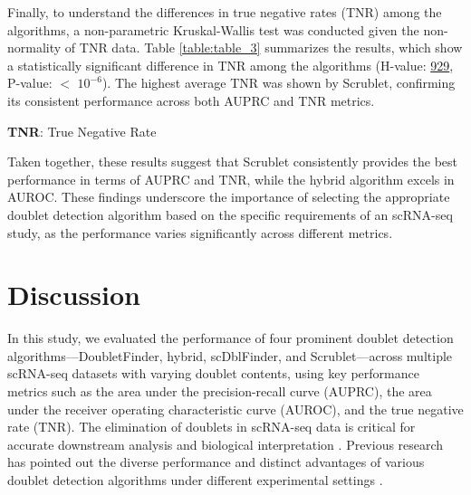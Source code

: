 \documentclass[11pt]{article}
\begin{document}
Finally, to understand the differences in true negative rates (TNR) among the algorithms, a non-parametric Kruskal-Wallis test was conducted given the non-normality of TNR data. Table \ref{table:table_3} summarizes the results, which show a statistically significant difference in TNR among the algorithms (H-value: \hyperlink{D0a}{929}, P-value: $<$ \hyperlink{D0b}{$10^{-6}$}). The highest average TNR was shown by Scrublet, confirming its consistent performance across both AUPRC and TNR metrics.

\begin{table}[h]
\caption{\protect\hyperlink{file-table-3-pkl}{Kruskal-Wallis results comparing True Negative Rate (TNR) across algorithms}}
\label{table:table_3}
\begin{threeparttable}
\renewcommand{\TPTminimum}{\linewidth}
\begin{tablenotes}
\footnotesize
\item \textbf{TNR}: True Negative Rate
\end{tablenotes}
\end{threeparttable}
\end{table}

Taken together, these results suggest that Scrublet consistently provides the best performance in terms of AUPRC and TNR, while the hybrid algorithm excels in AUROC. These findings underscore the importance of selecting the appropriate doublet detection algorithm based on the specific requirements of an scRNA-seq study, as the performance varies significantly across different metrics.

\section*{Discussion}

In this study, we evaluated the performance of four prominent doublet detection algorithms—DoubletFinder, hybrid, scDblFinder, and Scrublet—across multiple scRNA-seq datasets with varying doublet contents, using key performance metrics such as the area under the precision-recall curve (AUPRC), the area under the receiver operating characteristic curve (AUROC), and the true negative rate (TNR). The elimination of doublets in scRNA-seq data is critical for accurate downstream analysis and biological interpretation \cite{Xi2020BenchmarkingCD, Bais2019scdsCA, Choudhary2021ComparisonAE}. Previous research has pointed out the diverse performance and distinct advantages of various doublet detection algorithms under different experimental settings \cite{Xi2020BenchmarkingCD, Shainer2021ChoiceOA}.
\end{document}
